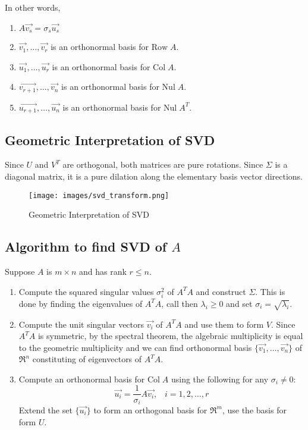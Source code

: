 \noindent
\newline
In other words,
\begin{enumerate}
    \item \(A \Vec{v_s} = \sigma_s \Vec{u_s}\)
    \item \(\Vec{v_1}, \dots, \Vec{v_r}\) is an orthonormal basis for \(\text{Row} \; A\).
    \item \(\Vec{u_1}, \dots, \Vec{u_r}\) is an orthonormal basis for \(\text{Col} \; A\).
    \item \(\Vec{v_{r+1}}, \dots, \Vec{v_n}\) is an orthonormal basis for \(\text{Nul} \; A\).
    \item \(\Vec{u_{r+1}}, \dots, \Vec{u_n}\) is an orthonormal basis for \(\text{Nul} \; A^T\).
\end{enumerate}

\subsection{Geometric Interpretation of SVD}
Since \(U\) and \(V^T\) are orthogonal, both matrices are pure rotations. Since \(\Sigma\) is a diagonal matrix, it is a pure dilation along the elementary basis vector directions.
\begin{figure}[H]
    \centering
    \texttt{[image: images/svd\_transform.png]}
    \caption{Geometric Interpretation of SVD}
    \label{fig:svd_geometric}
\end{figure}

\subsection{Algorithm to find SVD of \(A\)}
Suppose \(A\) is \(m\times n\) and has rank \(r \le n\).
\begin{enumerate}
    \item Compute the squared singular values \(\sigma_i^2\) of \(A^T A\) and construct \(\Sigma\). This is done by finding the eigenvalues of \(A^T A\), call then \(\lambda_i \ge 0\) and set \(\sigma_i = \sqrt{\lambda_i}\).
    \item Compute the unit singular vectors \(\Vec{v_i}\) of \(A^T A\) and use them to form \(V\). Since \(A^T A\) is symmetric, by the spectral theorem, the algebraic multiplicity is equal to the geometric multiplicity and we can find orthonormal basis \(\{ \Vec{v_1},\dots,\Vec{v_n} \}\) of \(\Re^n\) constituting of eigenvectors of \(A^T A\).
    \item Compute an orthonormal basis for \(\text{Col} \; A\) using the following for any \(\sigma_i \ne 0\):
    \[\Vec{u_i} = \frac{1}{\sigma_i} A \Vec{v_i}, \;\;\; i = 1,2,\dots,r\]
    Extend the set \(\{ \Vec{u_i} \}\) to form an orthogonal basis for \(\Re^m\), use the basis for form \(U\).
\end{enumerate}

